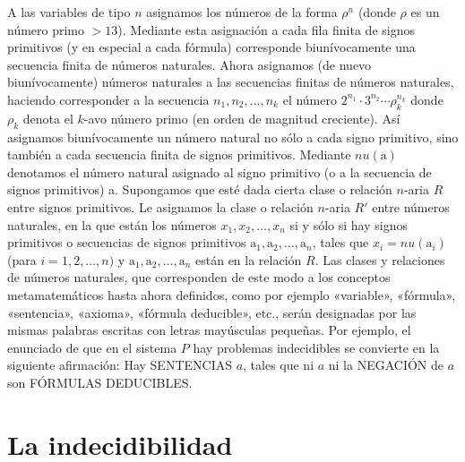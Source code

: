 A las variables de tipo $n$ asignamos los números de la forma $\rho^n$ (donde $\rho$ es un número primo $> 13$). Mediante esta asignación a cada fila finita de 
signos primitivos (y en especial a cada fórmula) corresponde biunívocamente una secuencia finita de números naturales. Ahora asignamos (de nuevo biunívocamente)
números naturales a las secuencias finitas de números naturales, haciendo corresponder a la secuencia $n_1, n_2, \dots, n_k$ el número 
$2^{n_1} \cdot 3^{n_2} \cdots \rho^{n_k}_k$ donde $\rho_k$ denota el $k$-avo número primo (en orden de magnitud creciente). Así asignamos biunívocamente un
número natural no sólo a cada signo primitivo, sino también a cada secuencia finita de signos primitivos. Mediante $nu(\text{a})$ denotamos
el número natural asignado al signo primitivo (o a la secuencia de signos primitivos) a. Supongamos que esté dada cierta clase o relación $n$-aria $R$ entre signos
primitivos. Le asignamos la clase o relación $n$-aria $R'$ entre números naturales, en la que están los números $x_1, x_2, \dots, x_n$ si y sólo si hay signos primitivos
o secuencias de signos primitivos $\text{a}_1, \text{a}_2, \dots, \text{a}_n$, tales que $x_i = nu(\text{a}_i)$ (para $i = 1, 2, \dots, n)$ y 
$\text{a}_1, \text{a}_2, \dots, \text{a}_n$ están en la relación $R$. Las clases y relaciones de números naturales, que corresponden de este modo a los conceptos
metamatemáticos hasta ahora definidos, como por ejemplo «variable», «fórmula», «sentencia», «axioma», «fórmula deducible», etc., serán designadas por las mismas 
palabras escritas con letras mayúsculas pequeñas. Por ejemplo, el enunciado de que en el sistema $P$ hay problemas indecidibles se convierte en la siguiente afirmación:
Hay SENTENCIAS $a$, tales que ni $a$ ni la NEGACIÓN de $a$ son FÓRMULAS DEDUCIBLES.

\section{La indecidibilidad}

